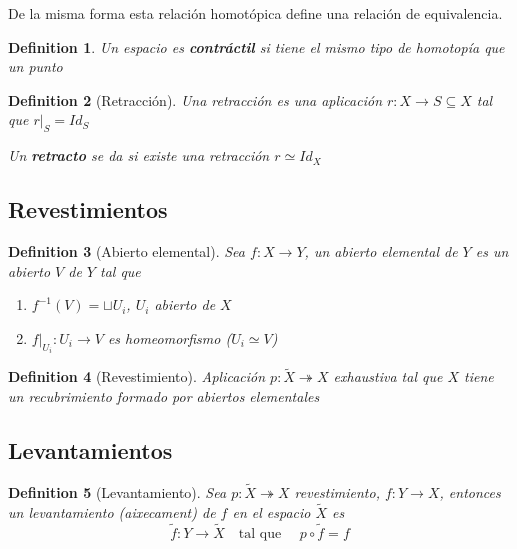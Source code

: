 \documentclass[leqno]{article}
\newtheorem*{definition}{Definition}
\begin{document}
De la misma forma esta relación homotópica define una relación de equivalencia.

\begin{definition}
Un espacio es \textbf{contráctil} si tiene el mismo tipo de homotopía que un punto 
\end{definition}

\begin{definition}[Retracción]
  Una retracción es una aplicación $r:X \to S \subseteq X$ tal que $r|_S = Id_S$

  Un \textbf{retracto} se da si existe una retracción $r\simeq Id_X$
\end{definition}

\subsection{Revestimientos}
\begin{definition}[Abierto elemental] Sea $f:X \to  Y$, un abierto elemental de $Y$ es un abierto $V$ de  $Y$ tal que
  \begin{enumerate}[topsep=-6pt, itemsep=0pt]
    \item $f^{-1}(V) = \sqcup U_i$, $U_i$ abierto de  $X$
	\item  $f|_{U_i}: U_i \to V$ es homeomorfismo ($U_i \simeq V$)
  \end{enumerate}
\end{definition}



\begin{definition}[Revestimiento] Aplicación $p:\tilde{X} \twoheadrightarrow X$ exhaustiva tal que $X$ tiene un recubrimiento formado por abiertos elementales
\end{definition}

\subsection{Levantamientos}

  \begin{minipage}{0.8\textwidth}
\begin{definition}[Levantamiento] Sea $p: \tilde{X} \twoheadrightarrow  X$ revestimiento, $f: Y \to X$, entonces un levantamiento (aixecament) de $f$ en el espacio  $\tilde{X}$ es
  \[
  \tilde{f}: Y \to \tilde{X} \quad \text{tal que } \quad p\circ \tilde{f} = f
  \] 
\end{definition}
  \end{minipage}
  \begin{minipage}{0.2\textwidth}
  \end{minipage}
\end{document}
